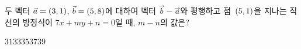 두 벡터 $\vec{a}=(3{,}\mkern3mu\mathopen{}1)$, $\vec{b}=(5{,}\mkern3mu\mathopen{}8)$에 대하여 벡터 $\vec{b}-\vec{a}$와 평행하고 점~$(5{,}\mkern3mu\mathopen{}1)$을 지나는 직선의 방정식이 $7x+my+n=0$일 때, $m-n$의 값은? 
\begin{choices32}{$31$}{$33$}{$35$}{$37$}{$39$}\end{choices32}
